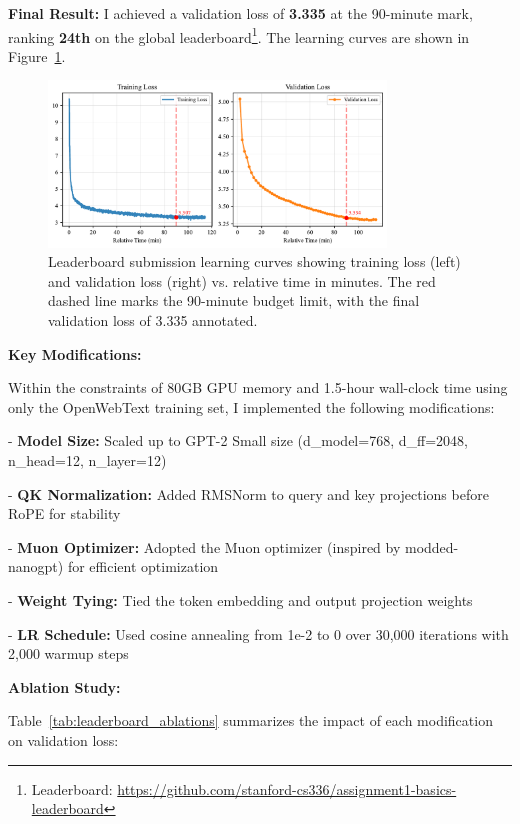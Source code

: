 \begin{answer}

\textbf{Final Result:} I achieved a validation loss of \textbf{3.335} at the 90-minute mark, ranking \textbf{24th} on the global leaderboard\footnote{Leaderboard: \url{https://github.com/stanford-cs336/assignment1-basics-leaderboard}}. The learning curves are shown in Figure~\ref{fig:leaderboard_experiments}.

\begin{figure}[!htb]
    \centering
    \includegraphics[width=0.8\textwidth]{images/leaderboard_experiments.pdf}
    \caption{Leaderboard submission learning curves showing training loss (left) and validation loss (right) vs. relative time in minutes. The red dashed line marks the 90-minute budget limit, with the final validation loss of 3.335 annotated.}
    \label{fig:leaderboard_experiments}
\end{figure}

\textbf{Key Modifications:}

Within the constraints of 80GB GPU memory and 1.5-hour wall-clock time using only the OpenWebText training set, I implemented the following modifications:

- \textbf{Model Size:} Scaled up to GPT-2 Small size (d\_model=768, d\_ff=2048, n\_head=12, n\_layer=12)

- \textbf{QK Normalization:} Added RMSNorm to query and key projections before RoPE for stability

- \textbf{Muon Optimizer:} Adopted the Muon optimizer (inspired by modded-nanogpt) for  efficient optimization

- \textbf{Weight Tying:} Tied the token embedding and output projection weights

- \textbf{LR Schedule:} Used cosine annealing from 1e-2 to 0 over 30,000 iterations with 2,000 warmup steps

\textbf{Ablation Study:}

Table~\ref{tab:leaderboard_ablations} summarizes the impact of each modification on validation loss:


\end{answer}
